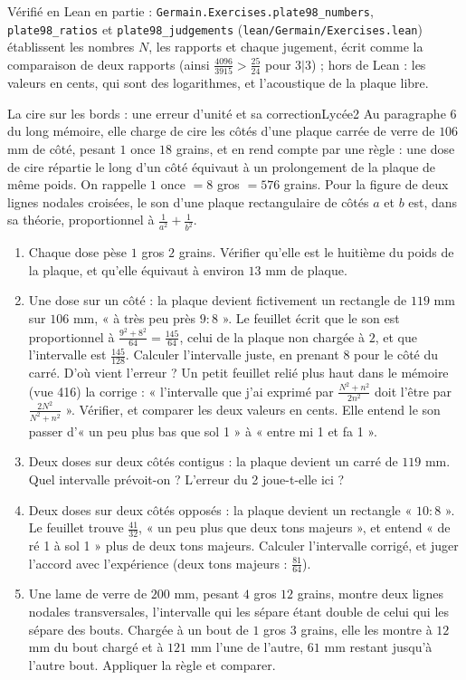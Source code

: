 \documentclass[11pt,a4paper]{article}
\begin{document}
\begin{solution}
Vérifié en Lean en partie : \texttt{Germain.Exercises.plate98\_numbers},
\texttt{plate98\_ratios} et \texttt{plate98\_judgements} (\texttt{lean/Germain/Exercises.lean}) établissent
les nombres $N$, les rapports et chaque jugement, écrit comme la comparaison de deux
rapports (ainsi $\frac{4096}{3915} > \frac{25}{24}$ pour $3|3$) ; hors de Lean : les
valeurs en cents, qui sont des logarithmes, et l'acoustique de la plaque libre.
\end{solution}

\begin{exercice}{La cire sur les bords : une erreur d'unité et sa correction}{Lycée}{2}
Au paragraphe 6 du long mémoire, elle charge de cire les côtés d'une plaque carrée de verre de
$106$ mm de côté, pesant $1$ once $18$ grains, et en rend compte par une règle : une
dose de cire répartie le long d'un côté équivaut à un prolongement de la plaque de
même poids. On rappelle $1$ once $= 8$ gros $= 576$ grains. Pour la figure de deux
lignes nodales croisées, le son d'une plaque rectangulaire de côtés $a$ et $b$ est,
dans sa théorie, proportionnel à $\frac1{a^2} + \frac1{b^2}$.
\begin{enumerate}
\item Chaque dose pèse $1$ gros $2$ grains. Vérifier qu'elle est le huitième du poids
  de la plaque, et qu'elle équivaut à environ $13$ mm de plaque.
\item Une dose sur un côté : la plaque devient fictivement un rectangle de $119$ mm
  sur $106$ mm, « à très peu près $9 : 8$ ». Le feuillet écrit que le son est
  proportionnel à $\frac{9^2+8^2}{64} = \frac{145}{64}$, celui de la plaque non chargée
  à $2$, et que l'intervalle est $\frac{145}{128}$. Calculer l'intervalle juste, en
  prenant $8$ pour le côté du carré. D'où vient l'erreur ? Un petit feuillet relié plus
  haut dans le mémoire (vue 416) la corrige : « l'intervalle que j'ai exprimé par
  $\frac{N^2+n^2}{2n^2}$ doit l'être par $\frac{2N^2}{N^2+n^2}$ ». Vérifier, et
  comparer les deux valeurs en cents. Elle entend le son passer d'« un peu plus bas que
  sol 1 » à « entre mi 1 et fa 1 ».
\item Deux doses sur deux côtés contigus : la plaque devient un carré de $119$ mm.
  Quel intervalle prévoit-on ? L'erreur du 2 joue-t-elle ici ?
\item Deux doses sur deux côtés opposés : la plaque devient un rectangle « $10 : 8$ ».
  Le feuillet trouve $\frac{41}{32}$, « un peu plus que deux tons majeurs », et entend
  « de ré 1 à sol 1 » plus de deux tons majeurs. Calculer l'intervalle corrigé, et
  juger l'accord avec l'expérience (deux tons majeurs : $\frac{81}{64}$).
\item Une lame de verre de $200$ mm, pesant $4$ gros $12$ grains, montre deux lignes
  nodales transversales, l'intervalle qui les sépare étant double de celui qui les
  sépare des bouts. Chargée à un bout de $1$ gros $3$ grains, elle les montre à $12$ mm
  du bout chargé et à $121$ mm l'une de l'autre, $61$ mm restant jusqu'à l'autre bout.
  Appliquer la règle et comparer.
\end{enumerate}
\end{exercice}
\end{document}
